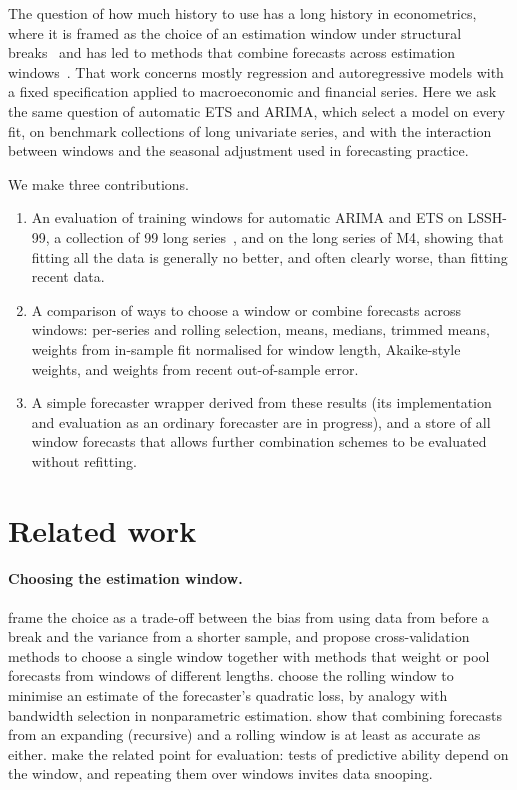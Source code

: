 \documentclass[11pt]{article}
\begin{document}
The question of how much history to use has a long history in econometrics,
where it is framed as the choice of an estimation window under structural
breaks~\citep{pesaran07window} and has led to methods that combine forecasts
across estimation windows~\citep{pesaran11averaging}. That work concerns
mostly regression and autoregressive models with a fixed specification applied
to macroeconomic and financial series. Here we ask the same question of
automatic ETS and ARIMA, which select a model on every fit, on benchmark
collections of long univariate series, and with the interaction between
windows and the seasonal adjustment used in forecasting practice.

We make three contributions.
\begin{enumerate}
\item An evaluation of training windows for automatic ARIMA and ETS on LSSH-99,
a collection of 99 long series~\citep{banwell26forecasting}, and on the long
series of M4, showing that fitting all the data is generally no better, and
often clearly worse, than fitting recent data.
\item A comparison of ways to choose a window or combine forecasts across
windows: per-series and rolling selection, means, medians, trimmed means,
weights from in-sample fit normalised for window length, Akaike-style weights,
and weights from recent out-of-sample error.
\item A simple forecaster wrapper derived from these results (its
implementation and evaluation as an ordinary forecaster are in progress), and a
store of all window forecasts that allows further combination schemes to be
evaluated without refitting.
\end{enumerate}

\section{Related work}
\label{sec:related}

\paragraph{Choosing the estimation window.}
\citet{pesaran07window} frame the choice as a trade-off between the bias from
using data from before a break and the variance from a shorter sample, and
propose cross-validation methods to choose a single window together with
methods that weight or pool forecasts from windows of different lengths.
\citet{inoue17rolling} choose the rolling window to minimise an estimate of the
forecaster's quadratic loss, by analogy with bandwidth selection in
nonparametric estimation. \citet{clark09combining} show that combining
forecasts from an expanding (recursive) and a rolling window is at least as
accurate as either. \citet{rossi12robust} make the related point for
evaluation: tests of predictive ability depend on the window, and repeating
them over windows invites data snooping.
\end{document}
